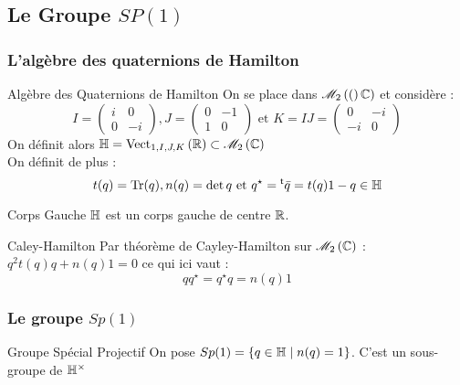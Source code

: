 \documentclass{cours}
\begin{document}
\subsection{Le Groupe $SP(1)$}
\subsubsection{L'algèbre des quaternions de Hamilton}
\begin{définition}{Algèbre des Quaternions de Hamilton}{}
    On se place dans $\mat{2}(\C)$ et considère :
    \[
        I = \begin{pmatrix}
            i & 0 \\ 0 & -i
        \end{pmatrix},
        J = \begin{pmatrix}
            0 & -1 \\ 1 & 0
        \end{pmatrix}
        \text{ et } K = IJ = \begin{pmatrix}
            0 & -i \\ -i & 0
        \end{pmatrix}
    \]
    On définit alors $\mathbb{H} = \vect[\R]{1, I, J, K} \subset \mat{2}{\C}$\\

    On définit de plus :
    \[
        t(q) = \Tr(q), n(q) = \det q \text{ et } q^{\star} = \transpose{\bar{q}} = t(q)1 - q \in \H
    \]
\end{définition}

\begin{propositionfr}{Corps Gauche}{}
    $\H$ est un corps gauche de centre $\R$.
\end{propositionfr}

\begin{propositionfr}{Caley-Hamilton}{}
    Par théorème de Cayley-Hamilton sur $\mat{2}{\C}$ : $q^{2}t(q)q + n(q)1 = 0$ ce qui ici vaut :
    \[qq^{\star} = q^{\star}q = n(q)1\]
\end{propositionfr}


\subsubsection{Le groupe $Sp(1)$}
\begin{définition}{Groupe Spécial Projectif}{}
    On pose $Sp(1) = \left\{q \in \H \mid n(q) = 1\right\}$. C'est un sous-groupe de $\H^{\times}$
\end{définition}
\end{document}
